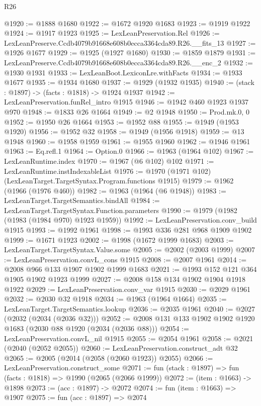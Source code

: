 \begin{lexlean}{R26}
\begin{coremodule}
@1920 := @1888 @1680
@1922 := @1672 @1920 @1683
@1923 := @1919 @1922
@1924 := @1917 @1923
@1925 := LexLeanPreservation.Rel
@1926 := LexLeanPreserve.Ccdb4079b91668e608b0ecca3364cda89.R26.__fits_13
@1927 := @1926 @1677
@1929 := @1925 (@1927 @1680)
@1930 := @1859 @1879
@1931 := LexLeanPreserve.Ccdb4079b91668e608b0ecca3364cda89.R26.__enc_2
@1932 := @1930 @1931
@1933 := LexLeanBoot.LexiconLre.withFacts
@1934 := @1933 @1677
@1935 := @1934 @1680
@1937 := @1929 (@1932 @1935)
@1940 := (stack : @1897) -> (facts : @1818) -> @1924 @1937
@1942 := LexLeanPreservation.funRel_intro @1915
@1946 := @1942 @460 @1923 @1937 @970
@1948 := @1833 @26 @1664
@1949 := @2 @1948
@1950 := Prod.mk.{0, 0}
@1952 := @1950 @26 @1664
@1953 := @1952 @88
@1955 := @1949 (@1953 @1920)
@1956 := @1952 @32
@1958 := @1949 (@1956 @1918)
@1959 := @13 @1948
@1960 := @1958 @1959
@1961 := @1955 @1960
@1962 := @1946 @1961
@1963 := Eq.refl.{1}
@1964 := Option.{0}
@1966 := @1963 (@1964 @102)
@1967 := LexLeanRuntime.index
@1970 := @1967 (@6 @102) @102
@1971 := LexLeanRuntime.instIndexableList
@1976 := @1970 (@1971 @102) (LexLeanTarget.TargetSyntax.Program.functions @1915)
@1979 := @1962 (@1966 (@1976 @460))
@1982 := @1963 (@1964 (@6 @1948))
@1983 := LexLeanTarget.TargetSemantics.bindAll
@1984 := LexLeanTarget.TargetSyntax.Function.parameters
@1990 := @1979 (@1982 (@1983 (@1984 @970) @1923 @1959))
@1992 := LexLeanPreservation.conv_build @1915
@1993 := @1992 @1961
@1998 := @1993 @336 @281 @968 @1909 @1902
@1999 := @1671 @1923
@2002 := @1998 (@1672 @1999 @1683)
@2003 := LexLeanTarget.TargetSyntax.Value.some
@2005 := @2002 (@2003 @1999)
@2007 := LexLeanPreservation.convL_cons @1915
@2008 := @2007 @1961
@2014 := @2008 @966 @133 @1907 @1902 @1999 @1683
@2021 := @1993 @152 @121 @364 @1905 @1902 @1923 @1999
@2027 := @2008 @158 @134 @1902 @1904 @1918 @1922
@2029 := LexLeanPreservation.conv_var @1915
@2030 := @2029 @1961
@2032 := @2030 @32 @1918
@2034 := @1963 (@1964 @1664)
@2035 := LexLeanTarget.TargetSemantics.lookup
@2036 := @2035 @1961
@2040 := @2027 (@2032 (@2034 (@2036 @32)))
@2052 := @2008 @131 @133 @1902 @1902 @1920 @1683 (@2030 @88 @1920 (@2034 (@2036 @88)))
@2054 := LexLeanPreservation.convL_nil @1915
@2055 := @2054 @1961
@2058 := @2021 (@2040 (@2052 @2055))
@2060 := LexLeanPreservation.construct_adt @32
@2065 := @2005 (@2014 (@2058 (@2060 @1923)) @2055)
@2066 := LexLeanPreservation.construct_some
@2071 := fun (stack : @1897) => fun (facts : @1818) => @1990 (@2065 (@2066 @1999))
@2072 := (item : @1663) -> @1898
@2073 := (acc : @1897) -> @2072
@2074 := fun (item : @1663) => @1907
@2075 := fun (acc : @1897) => @2074

\end{coremodule}
\end{lexlean}

